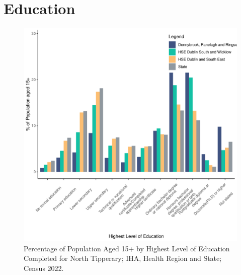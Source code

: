 \documentclass{article}
\begin{document}
\section{Education}\label{sect:Edu}
\begin{figure}[H]
	\centering
	\includegraphics[width = 120mm]{../figures/EduED.pdf}
	\caption{Percentage of Population Aged 15+ by Highest Level of Education Completed for North Tipperary; IHA, Health Region and State; Census 2022.}
	\label{fig:vbnv}
	\end{figure}
\end{document}
